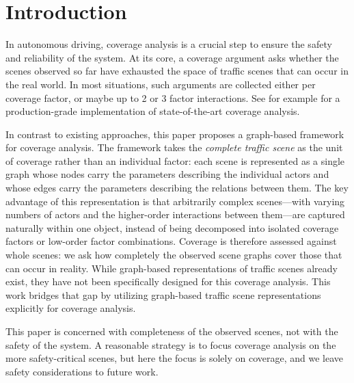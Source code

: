\section{Introduction}

In autonomous driving, coverage analysis is a crucial step to ensure the safety and reliability of the system.
At its core, a coverage argument asks whether the scenes observed so far have exhausted the space of traffic scenes that can occur in the real world.
In most situations, such arguments are collected either per coverage factor, or maybe up to 2 or 3 factor interactions.
See for example \cite{foretellix2019} for a production-grade implementation of state-of-the-art coverage analysis.

In contrast to existing approaches, this paper proposes a graph-based framework for coverage analysis.
The framework takes the \emph{complete traffic scene} as the unit of coverage rather than an individual factor: each scene is represented as a single graph whose nodes carry the parameters describing the individual actors and whose edges carry the parameters describing the relations between them.
The key advantage of this representation is that arbitrarily complex scenes---with varying numbers of actors and the higher-order interactions between them---are captured naturally within one object, instead of being decomposed into isolated coverage factors or low-order factor combinations.
Coverage is therefore assessed against whole scenes: we ask how completely the observed scene graphs cover those that can occur in reality.
While graph-based representations of traffic scenes already exist, they have not been specifically designed for this coverage analysis.
This work bridges that gap by utilizing graph-based traffic scene representations explicitly for coverage analysis.

This paper is concerned with completeness of the observed scenes, not with the safety of the system. A reasonable strategy is to focus coverage analysis on the more safety-critical scenes, but here the focus is solely on coverage, and we leave safety considerations to future work.


